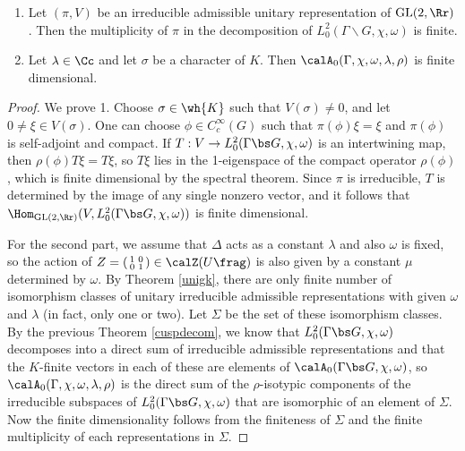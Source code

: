 \begin{theorem}
\label{autofin}
\begin{enumerate}
\item Let $(\pi, V)$ be an irreducible admissible unitary representation of $\GL(2, \Rr)$. Then the multiplicity of $\pi$ in the decomposition of $L^{2}_{0}(\Gamma \backslash G, \chi, \omega)$ is finite. 
\item Let $\lambda\in \Cc$ and let $\sigma$ be a character of $K$. Then $\calA_{0}(\Gamma, \chi, \omega, \lambda, \rho)$ is finite dimensional. 
\end{enumerate}
\end{theorem}
\begin{proof}
We prove 1. 
Choose $\sigma \in \wh{K}$ such that $V(\sigma)\neq 0$, and let $0\neq \xi\in V(\sigma)$. 
One can choose $\phi\in C_{c}^{\infty}(G)$ such that $\pi(\phi)\xi = \xi$ and $\pi(\phi)$ is self-adjoint and compact. 
If $T:V\to L_{0}^{2}(\Gamma \bs G, \chi, \omega)$ is an intertwining map, then $\rho(\phi)T\xi = T\xi$, so $T\xi$ lies in the 1-eigenspace of the compact operator $\rho(\phi)$, which is finite dimensional by the spectral theorem. 
Since $\pi$ is irreducible, $T$ is determined by the image of any single nonzero vector, and it follows that $\Hom_{\GL(2, \Rr)}(V, L_{0}^{2}(\Gamma \bs G, \chi, \omega))$ is finite dimensional. 

For the second part, we assume that $\Delta$ acts as a constant $\lambda$ and also $\omega$ is fixed, so the action of  $Z = \smat{1}{0}{0}{1}\in \calZ (U\frag)$ is also given by a constant $\mu$ determined by $\omega$. By Theorem \ref{unigk}, there are only finite number of isomorphism classes of unitary irreducible admissible representations with given $\omega$ and $\lambda$ (in fact, only one or two). 
Let $\Sigma$ be the set of these isomorphism classes. 
By the previous Theorem \ref{cuspdecom}, we know that $L_{0}^{2}(\Gamma \bs G, \chi, \omega)$ decomposes into a direct sum of irreducible admissible representations and that the $K$-finite vectors in each of these are elements of $\calA_{0}(\Gamma \bs G, \chi, \omega)$, so $\calA_{0}(\Gamma, \chi, \omega, \lambda, \rho)$ is the direct sum of the $\rho$-isotypic components of the irreducible subspaces of $L_{0}^{2}(\Gamma \bs G, \chi, \omega)$ that are isomorphic of an element of $\Sigma$. 
Now the finite dimensionality follows from the finiteness of $\Sigma$ and the finite multiplicity of each representations in $\Sigma$. 
\end{proof}

